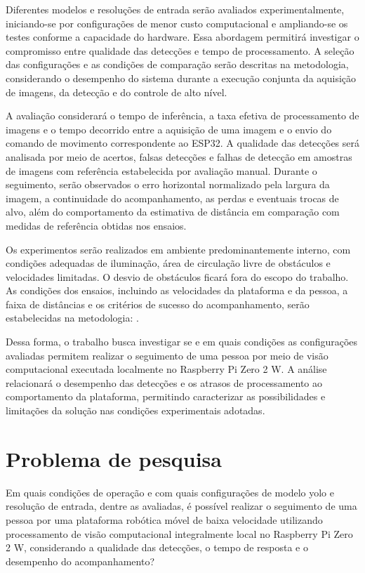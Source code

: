 Diferentes modelos e resoluções de entrada serão avaliados experimentalmente, iniciando-se por configurações de menor custo computacional e ampliando-se os testes conforme a capacidade do hardware. Essa abordagem permitirá investigar o compromisso entre qualidade das detecções e tempo de processamento. A seleção das configurações e as condições de comparação serão descritas na metodologia, considerando o desempenho do sistema durante a execução conjunta da aquisição de imagens, da detecção e do controle de alto nível.

A avaliação considerará o tempo de inferência, a taxa efetiva de processamento de imagens e o tempo decorrido entre a aquisição de uma imagem e o envio do comando de movimento correspondente ao ESP32. A qualidade das detecções será analisada por meio de acertos, falsas detecções e falhas de detecção em amostras de imagens com referência estabelecida por avaliação manual. Durante o seguimento, serão observados o erro horizontal normalizado pela largura da imagem, a continuidade do acompanhamento, as perdas e eventuais trocas de alvo, além do comportamento da estimativa de distância em comparação com medidas de referência obtidas nos ensaios.

Os experimentos serão realizados em ambiente predominantemente interno, com condições adequadas de iluminação, área de circulação livre de obstáculos e velocidades limitadas. O desvio de obstáculos ficará fora do escopo do trabalho. As condições dos ensaios, incluindo as velocidades da plataforma e da pessoa, a faixa de distâncias e os critérios de sucesso do acompanhamento, serão estabelecidas na metodologia: .

Dessa forma, o trabalho busca investigar se e em quais condições as configurações avaliadas permitem realizar o seguimento de uma pessoa por meio de visão computacional executada localmente no Raspberry Pi Zero 2 W. A análise relacionará o desempenho das detecções e os atrasos de processamento ao comportamento da plataforma, permitindo caracterizar as possibilidades e limitações da solução nas condições experimentais adotadas.

\section{Problema de pesquisa}
\label{sec:problema-pesquisa}

Em quais condições de operação e com quais configurações de modelo \gls{yolo} e resolução de entrada, dentre as avaliadas, é possível realizar o seguimento de uma pessoa por uma plataforma robótica móvel de baixa velocidade utilizando processamento de visão computacional integralmente local no Raspberry Pi Zero 2 W, considerando a qualidade das detecções, o tempo de resposta e o desempenho do acompanhamento?

